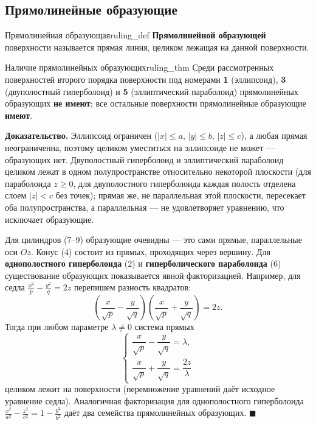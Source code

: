 \documentclass[12pt,a4paper]{article}
\newenvironment{myproof}{\noindent\textbf{Доказательство.}}{\hfill$\blacksquare$}
\begin{document}
\subsection*{Прямолинейные образующие}

\begin{definition}{Прямолинейная образующая}{ruling_def}
  \textbf{Прямолинейной образующей} поверхности называется прямая
  линия, целиком лежащая на данной поверхности.
\end{definition}

\begin{theorem}{Наличие прямолинейных образующих}{ruling_thm}
  Среди рассмотренных поверхностей второго порядка поверхности под
  номерами \textbf{1} (эллипсоид), \textbf{3} (двуполостный
  гиперболоид) и \textbf{5} (эллиптический параболоид) прямолинейных
  образующих \textbf{не имеют}; все остальные поверхности
  прямолинейные образующие \textbf{имеют}.
\end{theorem}

\begin{myproof}
  Эллипсоид ограничен ($|x| \le a$, $|y| \le b$, $|z| \le c$), а любая
  прямая неограниченна, поэтому целиком уместиться на эллипсоиде не
  может — образующих нет. Двуполостный гиперболоид и эллиптический
  параболоид целиком лежат в одном полупространстве относительно
  некоторой плоскости (для параболоида $z \ge 0$, для двуполостного
  гиперболоида каждая полость отделена слоем $|z| < c$ без точек);
  прямая же, не параллельная этой плоскости, пересекает оба
  полупространства, а параллельная — не удовлетворяет уравнению, что
  исключает образующие.

  Для цилиндров (7–9) образующие очевидны — это сами прямые,
  параллельные оси $Oz$. Конус (4) состоит из прямых, проходящих через
  вершину. Для \textbf{однополостного гиперболоида} (2) и
  \textbf{гиперболического параболоида} (6) существование образующих
  показывается явной факторизацией. Например, для седла
  $\frac{x^2}{p} - \frac{y^2}{q} = 2z$ перепишем разность квадратов:
  \[
    \left(\frac{x}{\sqrt p} - \frac{y}{\sqrt q}\right)
    \left(\frac{x}{\sqrt p} + \frac{y}{\sqrt q}\right) = 2z.
  \]
  Тогда при любом параметре $\lambda \ne 0$ система прямых
  \[
    \begin{cases}
      \dfrac{x}{\sqrt p} - \dfrac{y}{\sqrt q} = \lambda, \\[2mm]
      \dfrac{x}{\sqrt p} + \dfrac{y}{\sqrt q} = \dfrac{2z}{\lambda}
    \end{cases}
  \]
  целиком лежит на поверхности (перемножение уравнений даёт исходное
  уравнение седла). Аналогичная факторизация для однополостного
  гиперболоида
  $\frac{x^2}{a^2} - \frac{z^2}{c^2} = 1 - \frac{y^2}{b^2}$ даёт два
  семейства прямолинейных образующих.
\end{myproof}
\end{document}
